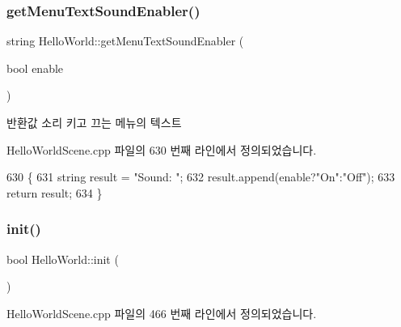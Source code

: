 \subsubsection{\texorpdfstring{get\+Menu\+Text\+Sound\+Enabler()}{getMenuTextSoundEnabler()}}
{\footnotesize\ttfamily string Hello\+World\+::get\+Menu\+Text\+Sound\+Enabler (\begin{DoxyParamCaption}\item[{bool}]{enable }\end{DoxyParamCaption})\hspace{0.3cm}{\ttfamily [protected]}}

\begin{DoxyReturn}{반환값}
소리 키고 끄는 메뉴의 텍스트 
\end{DoxyReturn}


Hello\+World\+Scene.\+cpp 파일의 630 번째 라인에서 정의되었습니다.


\begin{DoxyCode}
630                                                      \{
631     \textcolor{keywordtype}{string} result = \textcolor{stringliteral}{"Sound: "};
632     result.append(enable?\textcolor{stringliteral}{"On"}:\textcolor{stringliteral}{"Off"});
633     \textcolor{keywordflow}{return} result;
634 \}
\end{DoxyCode}
\mbox{\label{class_hello_world_a65e2b1525051f3690e5a39ca56608a97}} 
\subsubsection{\texorpdfstring{init()}{init()}}
{\footnotesize\ttfamily bool Hello\+World\+::init (\begin{DoxyParamCaption}{ }\end{DoxyParamCaption})\hspace{0.3cm}{\ttfamily [virtual]}}



Hello\+World\+Scene.\+cpp 파일의 466 번째 라인에서 정의되었습니다.


